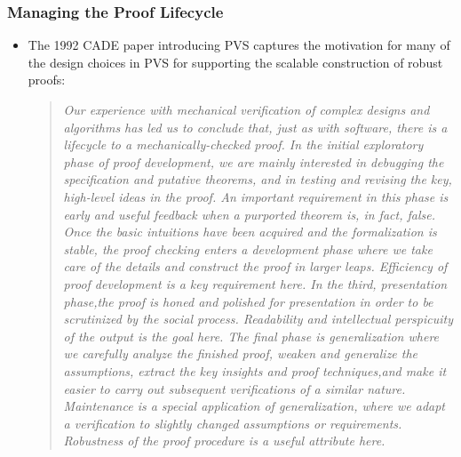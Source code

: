 \documentclass[xcolor=dvipsnames]{beamer}
\begin{document}
\begin{frame}[fragile]
\frametitle{Managing the Proof Lifecycle}
\begin{itemize}
\item The 1992 CADE paper introducing PVS captures the motivation for many of the design choices in PVS
for supporting the scalable construction of robust proofs: 
{\small\smaller\smaller
  \begin{quote}
  \emph{Our experience with mechanical verification of complex
    designs and algorithms has led us to conclude that, just as with software, there is a lifecycle
    to a mechanically-checked proof. In the initial exploratory phase of proof development, we are
    mainly interested in debugging the specification and putative theorems, and in testing and
    revising the key, high-level ideas in the proof. An important requirement in this phase is early
    and useful feedback when a purported theorem is, in fact, false. Once the basic intuitions have
    been acquired and the formalization is stable, the proof checking enters a development phase
    where we take care of the details and construct the proof in larger leaps. Efficiency of proof
    development is a key requirement here. In the third, presentation phase,the proof is honed and
    polished for presentation in order to be scrutinized by the social process.  Readability and
    intellectual perspicuity of the output is the goal here. The final phase is generalization where
    we carefully analyze the finished proof, weaken and generalize the assumptions, extract the key
    insights and proof techniques,and make it easier to carry out subsequent verifications of a
    similar nature.  Maintenance is a special application of generalization, where we adapt a
    verification to slightly changed assumptions or requirements.  Robustness of the proof procedure
    is a useful attribute here.  }
  \end{quote}
}
\end{itemize}
\end{frame}
\end{document}
